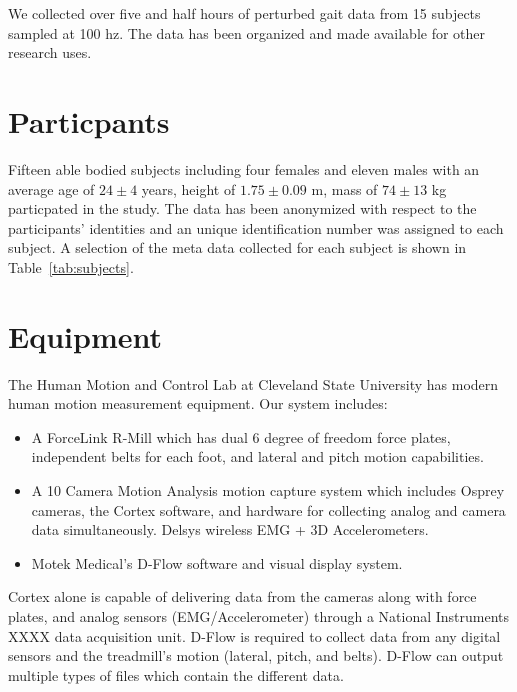 \documentclass[10pt,a4paper,twocolumn]{article}
\begin{document}
We collected over five and half hours of perturbed gait data from 15 subjects
sampled at 100 hz. The data has been organized and made available for other
research uses.

\section*{Particpants}
%
Fifteen able bodied subjects including four females and eleven males with an
average age of $24\pm4$ years, height of $1.75\pm0.09$ m, mass of $74\pm13$ kg
particpated in the study. The data has been anonymized with respect to the
participants' identities and an unique identification number was assigned to
each subject. A selection of the meta data collected for each subject is shown
in Table~\ref{tab:subjects}.
%
\begin{table}
  \cprotect\caption{Information about the 15 participants. The final three
    columns give the trial numbers associated with each nominal treadmill
    speed. Additional trials with subject 0 are trials with no subject, i.e.
    unloaded trials that can be used for force compensation purposes, and are
    not shown in the table. Generated by \verb|src/subject_table.py|.}
  \centering
  
  \label{tab:subjects}
\end{table}

\section*{Equipment}
%
The Human Motion and Control Lab at Cleveland State University has modern human
motion measurement equipment. Our system includes:

\begin{itemize}
  \item A ForceLink R-Mill which has dual 6 degree of freedom force plates,
    independent belts for each foot, and lateral and pitch motion capabilities.
  \item A 10 Camera Motion Analysis motion capture system which includes Osprey
    cameras, the Cortex software, and hardware for collecting analog and camera
    data simultaneously. Delsys wireless EMG + 3D Accelerometers.
  \item Motek Medical’s D-Flow software and visual display system.
\end{itemize}

Cortex alone is capable of delivering data from the cameras along with force
plates, and analog sensors (EMG/Accelerometer) through a National Instruments
XXXX data acquisition unit. D-Flow is required to collect data from any digital
sensors and the treadmill's motion (lateral, pitch, and belts). D-Flow can
output multiple types of files which contain the different data.
\end{document}
